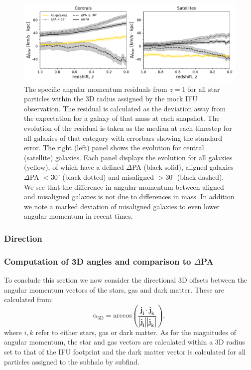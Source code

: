 \begin{figure}
	\includegraphics[width=\linewidth]{misalignment_TNG/delta_j_stars_residuals.pdf}
    \caption{The specific angular momentum residuals from $z=1$ for all star particles within the 3D radius assigned by the mock IFU observation. The residual is calculated as the deviation away from the expectation for a galaxy of that mass at each snapshot. The evolution of the residual is taken as the median at each timestep for all galaxies of that category with errorbars showing the standard error. The right (left) panel shows the evolution for central (satellite) galaxies. Each panel displays the evolution for all galaxies (yellow), of which have a defined $\Delta$PA (black solid), aligned galaxies $\Delta$PA $< 30^{\circ}$ (black dotted) and misaligned $> 30^{\circ}$ (black dashed). We see that the difference in angular momentum between aligned and misaligned galaxies is not due to differences in mass. In addition we note a marked deviation of misaligned galaxies to even lower angular momentum in recent times.}
    \label{fig:sJ_evo_residual}
\end{figure}

\subsubsection{Direction}
\subsubsection{Computation of 3D angles and comparison to $\Delta$PA}
To conclude this section we now consider the directional 3D offsets between the angular momentum vectors of the stars, gas and dark matter. These are calculated from:
\begin{equation} \label{eq:alpha}
\mathrm{\alpha_{3D} = \text{arccos} \left( \frac{\boldsymbol{j_{i}} \cdot \boldsymbol{j_{k}}}{\left| \boldsymbol{j_{i}} \right| \left| \boldsymbol{j_{k}} \right|} \right),}
\end{equation}
where $i, k$ refer to either stars, gas or dark matter. As for the magnitudes of angular momentum, the star and gas vectors are calculated within a 3D radius set to that of the IFU footprint and the dark matter vector is calculated for all particles assigned to the subhalo by subfind.

